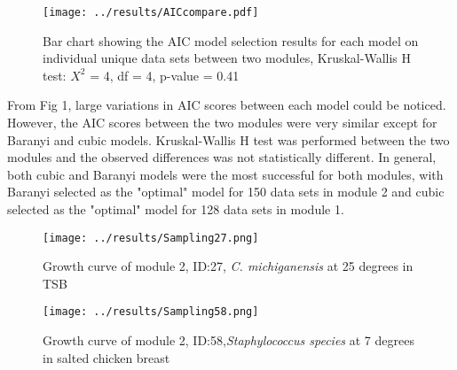 \documentclass[11pt, a4paper]{article} %
\begin{document}
\newpage

\begin{figure}[t!]
    \centering
    \texttt{[image: ../results/AICcompare.pdf]}
    \caption{Bar chart showing the AIC model selection results for each model on individual unique data sets between two modules, Kruskal-Wallis H test: $X^2$ = 4, df = 4, p-value = 0.41}
    \label{Figure_1}
\end{figure}

\noindent From Fig 1, large variations in AIC scores between each model could be noticed. However, the AIC scores between the two modules were very similar except for Baranyi and cubic models. Kruskal-Wallis H test was performed between the two modules and the observed differences was not statistically different. In general, both cubic and Baranyi models were the most successful for both modules, with Baranyi selected as the "optimal" model for 150 data sets in module 2 and cubic selected as the "optimal" model for 128 data sets in module 1.


\newpage

\begin{figure}[!tbp]
  \centering
  \begin{minipage}[b]{0.45\textwidth}
    \texttt{[image: ../results/Sampling27.png]}
    \caption{Growth curve of module 2, ID:27, \textit{C. michiganensis} at 25 degrees in TSB}
  \end{minipage}
  \hfill
  \begin{minipage}[b]{0.45\textwidth}
    \texttt{[image: ../results/Sampling58.png]}
    \caption{Growth curve of module 2, ID:58,\textit{Staphylococcus species} at 7 degrees in salted chicken breast}
  \end{minipage}
\end{figure}
\end{document}
